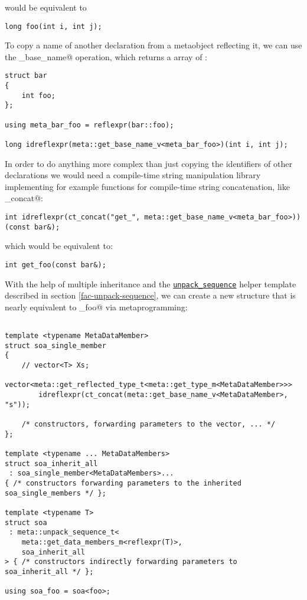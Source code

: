 would be equivalent to 

\begin{verbatim}
long foo(int i, int j);
\end{verbatim}

To copy a name of another declaration from a metaobject reflecting it,
we can use the \verb@get_base_name@ operation, which returns a \verb@constexpr@
array of \verb@char@s:

\begin{verbatim}
struct bar
{
	int foo;
};

using meta_bar_foo = reflexpr(bar::foo);

long idreflexpr(meta::get_base_name_v<meta_bar_foo>)(int i, int j);
\end{verbatim}

In order to do anything more complex than just
copying the identifiers of other declarations we would need a compile-time
string manipulation library implementing for example functions for
compile-time string concatenation, like \verb@ct_concat@:

\begin{verbatim}
int idreflexpr(ct_concat("get_", meta::get_base_name_v<meta_bar_foo>))(const bar&);
\end{verbatim}

which would be equivalent to:

\begin{verbatim}
int get_foo(const bar&);
\end{verbatim}

With the help of multiple inheritance and the
\hyperref[fac-unpack-sequence]{\texttt{unpack\_sequence}} helper template described
in section \ref{fac-unpack-sequence}, we can create a new structure that is
nearly equivalent to \verb@soa_foo@ via metaprogramming:

\begin{verbatim}

template <typename MetaDataMember>
struct soa_single_member
{
	// vector<T> Xs;
	vector<meta::get_reflected_type_t<meta::get_type_m<MetaDataMember>>>
		idreflexpr(ct_concat(meta::get_base_name_v<MetaDataMember>, "s"));

	/* constructors, forwarding parameters to the vector, ... */
};

template <typename ... MetaDataMembers>
struct soa_inherit_all
 : soa_single_member<MetaDataMembers>...
{ /* constructors forwarding parameters to the inherited soa_single_members */ };

template <typename T>
struct soa
 : meta::unpack_sequence_t<
	meta::get_data_members_m<reflexpr(T)>,
	soa_inherit_all
> { /* constructors indirectly forwarding parameters to soa_inherit_all */ };

using soa_foo = soa<foo>;
\end{verbatim}

